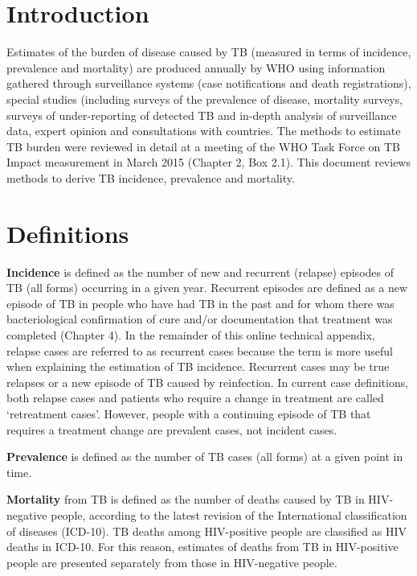 \section{Introduction}

Estimates of the burden of disease caused by TB (measured in terms of incidence, prevalence and mortality) are produced annually by WHO using information gathered through surveillance systems (case notifications and death registrations), special studies (including surveys of the prevalence of disease, mortality surveys, surveys of under-reporting of detected TB and in-depth analysis of surveillance data, expert opinion and consultations with countries. The methods to estimate TB burden were reviewed in detail at a meeting of the WHO Task Force on TB Impact measurement in March 2015 (Chapter 2, Box 2.1). This document reviews methods to derive TB incidence, prevalence and mortality.

\section{Definitions}
\textbf{Incidence} is defined as the number of new and recurrent (relapse) episodes of TB (all forms) occurring in a given year. Recurrent episodes are defined as a new episode of TB in people who have had TB in the past and for whom there was bacteriological confirmation of cure and/or documentation that treatment was completed (Chapter 4). In the remainder of this online technical appendix, relapse cases are referred to as recurrent cases because the term is more useful when explaining the estimation of TB incidence. Recurrent cases may be true relapses or a new episode of TB caused by reinfection. In current case definitions, both relapse cases and patients who require a change in treatment are called ‘retreatment cases’. However, people with a continuing episode of TB that requires a treatment change are prevalent cases, not incident cases.

\textbf{Prevalence} is defined as the number of TB cases (all forms) at a given point in time. 

\textbf{Mortality} from TB is defined as the number of deaths caused by TB in HIV-negative people, according to the latest revision of the International classification of diseases (ICD-10). TB deaths among HIV-positive people are classified as HIV deaths in ICD-10. For this reason, estimates of deaths from TB in HIV-positive people are presented separately from those in HIV-negative people.

